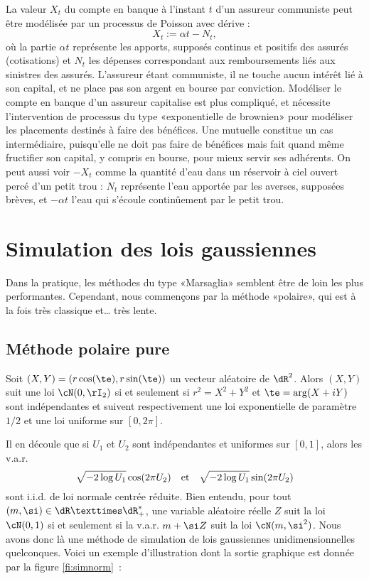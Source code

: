\begin{rem}
La valeur $X_t$ du compte en banque à l'instant $t$ d'un assureur communiste peut être 
modélisée par un processus de Poisson avec dérive :
$$
X_t:=\alpha t - N_t,
$$
où la partie $\alpha t$ représente les apports, supposés continus et positifs
des assurés (cotisations) et $N_t$ les dépenses correspondant aux
remboursements liés aux sinistres des assurés. L'assureur étant communiste, il
ne touche aucun intérêt lié à son capital, et ne place pas son argent en
bourse par conviction.  Modéliser le compte en banque d'un assureur capitalise
est plus compliqué, et nécessite l'intervention de processus du type
«exponentielle de brownien» pour modéliser les placements destinés à faire des
bénéfices.  Une mutuelle constitue un cas intermédiaire, puisqu'elle ne doit
pas faire de bénéfices mais fait quand même fructifier son capital, y compris
en bourse, pour mieux servir ses adhérents.  On peut aussi voir $-X_t$ comme
la quantité d'eau dans un réservoir à ciel ouvert percé d'un petit trou :
$N_t$ représente l'eau apportée par les averses, supposées brèves, et $-\alpha t$
l'eau qui s'écoule continûement par le petit trou.
\end{rem}

%
\section{Simulation des lois gaussiennes}
\label{ss:simu-gauss}
%

Dans la pratique, les méthodes du type «Marsaglia» semblent être de loin les
plus performantes. Cependant, nous commençons par la méthode «polaire», qui
est à la fois très classique et\ldots{} très lente.

\subsection{Méthode polaire pure}

\begin{theorem}
  Soit $(X,Y)=(r\cos(\te),r\sin(\te))$ un vecteur aléatoire de $\dR^2$. Alors
  $(X,Y)$ suit une loi $\cN(0,\rI_2)$ si et seulement si $r^2=X^2+Y^2$ et
  $\te=\arg(X+iY)$ sont indépendantes et suivent respectivement une loi
  exponentielle de paramètre $1/2$ et une loi uniforme sur $[0,2\pi]$.
\end{theorem}

Il en découle que si $U_1$ et $U_2$ sont indépendantes et uniformes sur
$[0,1]$, alors les v.a.r.
$$
\sqrt{-2\log U_1} \cos(2\pi U_2) \text{\quad et\quad} \sqrt{-2\log U_1}\sin(2\pi U_2)
$$
sont i.i.d. de loi normale centrée réduite. Bien entendu, pour tout
$(m,\si)\in\dR×\dR_+^*$, une variable aléatoire réelle $Z$ suit la loi
$\cN(0,1)$ si et seulement si la v.a.r. $m+\si Z$ suit la loi $\cN(m,\si^2)$.
Nous avons donc là une méthode de simulation de lois gaussiennes
unidimensionnelles quelconques. Voici un exemple d'illustration dont la sortie
graphique est donnée par la figure \ref{fi:simnorm}~:
%
%
%
